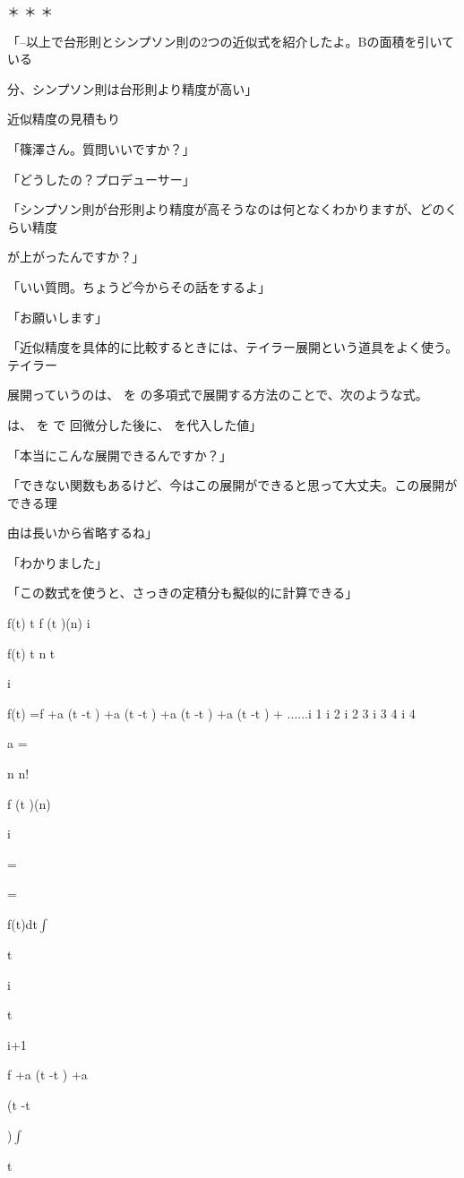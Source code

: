 ＊ ＊ ＊\par
「--以上で台形則とシンプソン則の2つの近似式を紹介したよ。Bの⾯積を引いている\par
分、シンプソン則は台形則より精度が⾼い」\par
近似精度の⾒積もり\par
「篠澤さん。質問いいですか？」\par
「どうしたの？プロデューサー」\par
「シンプソン則が台形則より精度が⾼そうなのは何となくわかりますが、どのくらい精度\par
が上がったんですか？」\par
「いい質問。ちょうど今からその話をするよ」\par
「お願いします」\par
「近似精度を具体的に⽐較するときには、テイラー展開という道具をよく使う。テイラー\par
展開っていうのは、 を の多項式で展開する⽅法のことで、次のような式。\par
は、 を で 回微分した後に、 を代⼊した値」\par
「本当にこんな展開できるんですか？」\par
「できない関数もあるけど、今はこの展開ができると思って⼤丈夫。この展開ができる理\par
由は長いから省略するね」\par
「わかりました」\par
「この数式を使うと、さっきの定積分も擬似的に計算できる」\par
f(t) t f (t  )(n) i\par
f(t) t n t\par
i\par
f(t) =f  +a  (t -t  ) +a  (t -t  ) +a  (t -t  ) +a  (t -t  ) + ......i 1 i 2 i 2 3 i 3 4 i 4\par
a  =\par
n n!\par
f (t )(n)\par
i\par
=\par
=\par
f(t)dt$\int$\par
t\par
i\par
t\par
i+1\par
f  +a (t -t  ) +a\par
(t -t\par
)$\int$\par
t\par
